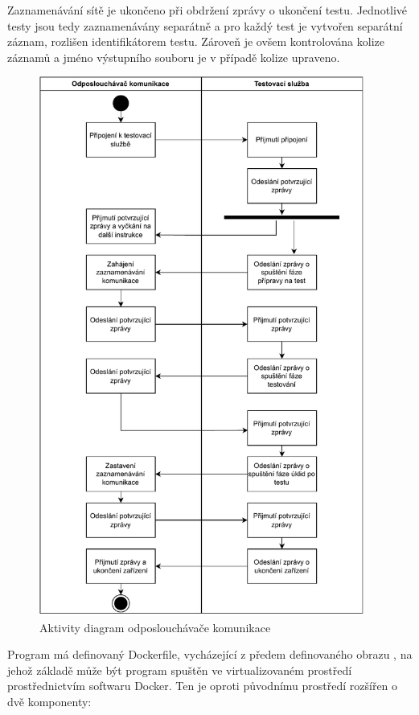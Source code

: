 Zaznamenávání sítě je ukončeno při obdržení zprávy o ukončení testu. Jednotlivé testy jsou tedy zaznamenávány separátně a pro každý test je vytvořen separátní záznam, rozlišen identifikátorem testu. Zároveň je ovšem kontrolována kolize záznamů a jméno výstupního souboru je v případě kolize upraveno. 

\begin{figure}[htbp]
    \centering 
    \includegraphics[width=0.95\textwidth]{assets/img/activity_networklogger.pdf}
    \caption{Aktivity diagram odposlouchávače komunikace}
    \label{fig:logger_activity}
\end{figure}

Program má definovaný Dockerfile, vycházející z předem definovaného obrazu , na jehož základě může být program spuštěn ve virtualizovaném prostředí prostřednictvím softwaru Docker. Ten je oproti původnímu prostředí rozšířen o dvě komponenty:

